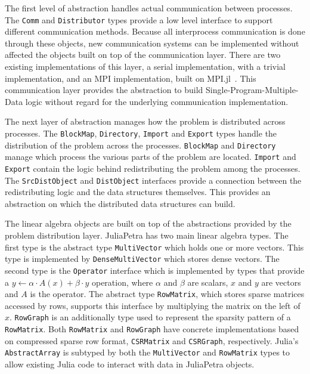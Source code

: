 \documentclass[acmsmall]{acmart}
\newcommand{\snippet}[1]{\lstinline{#1}}
\begin{document}
	The first level of abstraction handles actual communication between processes.
	The \snippet{Comm} and \snippet{Distributor} types provide a low level interface to support different communication methods.
	Because all interprocess communication is done through these objects, new communication systems can be implemented without affected the objects built on top of the communication layer.
	There are two existing implementations of this layer, a serial implementation, with a trivial implementation, and an MPI implementation, built on MPI.jl~\cite{Github:MPI}.
	This communication layer provides the abstraction to build Single-Program-Multiple-Data logic without regard for the underlying communication implementation.
	
	The next layer of abstraction manages how the problem is distributed across processes.
	The \snippet{BlockMap}, \snippet{Directory}, \snippet{Import} and \snippet{Export}
	types handle the distribution of the problem across the processes.
	\snippet{BlockMap} and \snippet{Directory} manage which process the various parts of
	the problem are located.
	\snippet{Import} and \snippet{Export} contain the logic behind redistributing
	the problem among the processes.
	The \snippet{SrcDistObject} and \snippet{DistObject} interfaces provide a connection between
	the redistributing logic and the data structures themselves.
	This provides an abstraction on which the distributed data structures can build.
	
	The linear algebra objects are built on top of the abstractions provided by the problem distribution layer.
	JuliaPetra has two main linear algebra types.
	The first type is the abstract type \snippet{MultiVector} which holds one or more vectors.
	This type is implemented by \snippet{DenseMultiVector} which stores dense vectors.
	The second type is the \snippet{Operator} interface which is implemented by types that provide a
	\(y \gets \alpha\cdot A(x) + \beta\cdot y\) operation, where \(\alpha\) and \(\beta\) are scalars,
	\(x\) and \(y\) are vectors and \(A\) is the operator.
	The abstract type \snippet{RowMatrix}, which stores sparse matrices accessed by rows,
	supports this interface by multiplying the matrix on the left of \(x\).
	\snippet{RowGraph} is an additionally type used to represent the sparsity pattern of a \snippet{RowMatrix}.
	Both \snippet{RowMatrix} and \snippet{RowGraph} have concrete implementations based on
	compressed sparse row format, \snippet{CSRMatrix} and \snippet{CSRGraph}, respectively.
	Julia's \snippet{AbstractArray} is subtyped by both the \snippet{MultiVector}
	and \snippet{RowMatrix} types to allow existing Julia code to interact with data in JuliaPetra objects.
	
\end{document}
